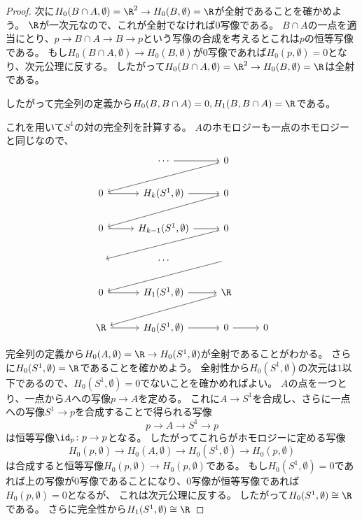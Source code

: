 \documentclass{jsarticle}
\begin{document}
\begin{proof}
次に$H_0(B\cap A,\emptyset)=\R^2\to H_0(B,\emptyset)=\R$が全射であることを確かめよう。
$\R$が一次元なので、これが全射でなければ$0$写像である。
$B\cap A$の一点を適当にとり、$p\to B\cap A\to B\to p$という写像の合成を考えるとこれは$p$の恒等写像である。
もし$H_0(B\cap A,\emptyset)\to H_0(B,\emptyset)$が$0$写像であれば$H_0(p,\emptyset)=0$となり、次元公理に反する。
したがって$H_0(B\cap A,\emptyset)=\R^2\to H_0(B,\emptyset)=\R$は全射である。

したがって完全列の定義から$H_0(B,B\cap A)=0, H_1(B,B\cap A)=\R$である。

これを用いて$S^1$の対の完全列を計算する。
$A$のホモロジーも一点のホモロジーと同じなので、
\[
\begin{tikzcd}
~ &\cdots \ar[r] &0 \ar[dll]\\
0 \ar[r] &H_k(S^1,\emptyset) \ar[r] &0 \ar[dll]\\
0 \ar[r] &H_{k-1}(S^1,\emptyset) \ar[r] &0 \ar[dll]\\
~&\cdots&\ar[dll]\\
0 \ar[r] &H_{1}(S^1,\emptyset) \ar[r] &\R \ar[dll]\\
\R \ar[r] &H_{0}(S^1,\emptyset) \ar[r] &0 \ar[r]&0
\end{tikzcd}
\]

完全列の定義から$H_0(A,\emptyset)=\R\to H_0(S^1,\emptyset)$が全射であることがわかる。
さらに$H_0(S^1,\emptyset)=\R$であることを確かめよう。
全射性から$H_0(S^1,\emptyset)$の次元は$1$以下であるので、$H_0(S^1,\emptyset)=0$でないことを確かめればよい。
$A$の点を一つとり、一点から$A$への写像$p\to A$を定める。
これに$A\to S^1$を合成し、さらに一点への写像$S^1\to p$を合成することで得られる写像
\[
p\to A\to S^1\to p
\]
は恒等写像$\id_p\colon p\to p$となる。
したがってこれらがホモロジーに定める写像
\[
H_0(p,\emptyset)\to H_0(A,\emptyset)\to H_0(S^1,\emptyset)\to H_0(p,\emptyset)
\]
は合成すると恒等写像$H_0(p,\emptyset)\to H_0(p,\emptyset)$である。
もし$H_0(S^1,\emptyset)=0$であれば上の写像が$0$写像であることになり、$0$写像が恒等写像であれば$H_0(p,\emptyset)=0$となるが、
これは次元公理に反する。
したがって$H_0(S^1,\emptyset)\cong\R$である。
さらに完全性から$H_1(S^1,\emptyset)\cong\R$
\end{proof}
\end{document}
